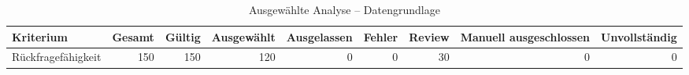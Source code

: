 \begin{table}[htbp]
\centering
\caption{Ausgewählte Analyse -- Datengrundlage}
\begin{tabular}{lrrrrrrrr}
\toprule
Kriterium & Gesamt & Gültig & Ausgewählt & Ausgelassen & Fehler & Review & Manuell ausgeschlossen & Unvollständig \\
\midrule
Rückfragefähigkeit & 150 & 150 & 120 & 0 & 0 & 30 & 0 & 0 \\
\bottomrule
\end{tabular}
\end{table}
